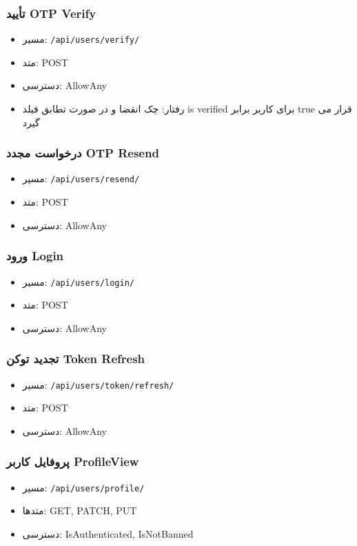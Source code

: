 \subsubsection{تأیید OTP Verify}
\begin{itemize}
  \item مسیر: \texttt{/api/users/verify/}
  \item متد: POST
  \item دسترسی: AllowAny
  \item رفتار: چک انقضا و در صورت تطابق فیلد is verified برای کاربر برابر true قرار می گیرد
\end{itemize}

\subsubsection{درخواست مجدد OTP Resend}
\begin{itemize}
  \item مسیر: \texttt{/api/users/resend/}
  \item متد: POST
  \item دسترسی: AllowAny
\end{itemize}

\subsubsection{ورود Login}
\begin{itemize}
  \item مسیر: \texttt{/api/users/login/}
  \item متد: POST
  \item دسترسی: AllowAny
\end{itemize}

\subsubsection{تجدید توکن Token Refresh}
\begin{itemize}
  \item مسیر: \texttt{/api/users/token/refresh/}
  \item متد: POST
  \item دسترسی: AllowAny
\end{itemize}

\subsubsection{پروفایل کاربر ProfileView}
\begin{itemize}
  \item مسیر: \texttt{/api/users/profile/}
  \item متدها: GET, PATCH, PUT
  \item دسترسی: IsAuthenticated, IsNotBanned
\end{itemize}

